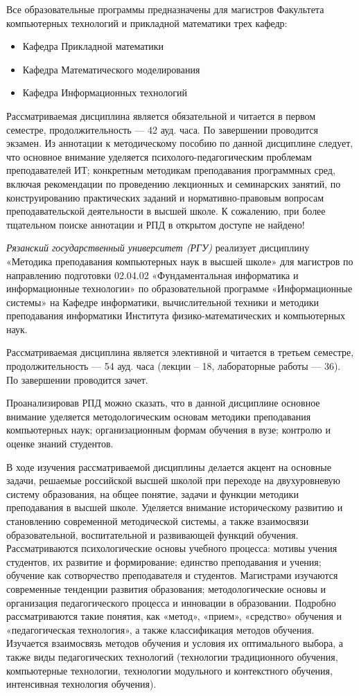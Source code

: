 \documentclass{math-mech-sci}
\begin{document}
Все образовательные программы предназначены для магистров Факультета компьютерных технологий и прикладной математики трех кафедр:
\begin{itemize}
\item Кафедра Прикладной математики
\item Кафедра Математического моделирования 
\item Кафедра Информационных технологий
\end{itemize}

Рассматриваемая дисциплина является обязательной и читается в первом семестре, продолжительность –-- 42 ауд. часа. По завершении проводится экзамен.
Из аннотации к методическому пособию по данной дисциплине следует, что основное внимание уделяется психолого-педагогическим проблемам преподавателей ИТ; конкретным методикам преподавания программных сред, включая рекомендации по проведению лекционных и семинарских занятий, по конструированию практических заданий и нормативно-правовым вопросам преподавательской деятельности в высшей школе.
К сожалению, при более тщательном поиске аннотации и РПД в открытом доступе не найдено!

{\it Рязанский государственный университет (РГУ)} реализует дисциплину «Методика преподавания компьютерных наук в высшей школе» для магистров по направлению подготовки 02.04.02 «Фундаментальная информатика и информационные технологии» по образовательной программе «Информационные системы» на Кафедре информатики, вычислительной техники и методики преподавания информатики Института физико-математических и компьютерных наук.

Рассматриваемая дисциплина является элективной и читается в третьем семестре, продолжительность –-- 54 ауд. часа (лекции – 18, лабораторные работы --– 36). По завершении проводится зачет.

Проанализировав РПД можно сказать, что в данной дисциплине основное внимание уделяется методологическим основам методики преподавания компьютерных наук; организационным формам обучения в вузе; контролю и оценке знаний студентов.

В ходе изучения рассматриваемой дисциплины делается акцент на основные задачи, решаемые российской высшей школой при переходе на двухуровневую систему образования, на общее понятие, задачи и функции методики преподавания в высшей школе. Уделяется внимание историческому развитию и становлению современной методической системы, а также взаимосвязи образовательной, воспитательной и развивающей функций обучения. Рассматриваются психологические основы учебного процесса: мотивы учения студентов, их развитие и формирование; единство преподавания и учения; обучение как сотворчество преподавателя и студентов. Магистрами изучаются современные тенденции развития образования; методологические основы и организация педагогического процесса и инновации в образовании.
Подробно рассматриваются такие понятия, как «метод», «прием», «средство» обучения и «педагогическая технология», а также классификация методов обучения. Изучается взаимосвязь методов обучения и условия их оптимального выбора, а также виды педагогических технологий (технологии традиционного обучения, компьютерные технологии, технологии модульного и контекстного обучения, интенсивная технология обучения).
\end{document}
